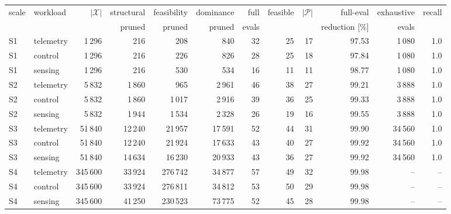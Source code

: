 \scriptsize
\setlength{\tabcolsep}{3.5pt}
\begin{tabular}{llrrrrrrrrrr}
\toprule
scale & workload & $|\mathcal{X}|$ & structural & feasibility & dominance & full & feasible & $|\mathcal{P}|$ & full-eval & exhaustive & recall \\
 & & & pruned & pruned & pruned & evals & & & reduction [\%] & evals & \\
\midrule
S1 & telemetry & 1\,296 & 216 & 208 & 840 & 32 & 25 & 17 & 97.53 & 1\,080 & 1.0 \\
S1 & control & 1\,296 & 216 & 226 & 826 & 28 & 25 & 18 & 97.84 & 1\,080 & 1.0 \\
S1 & sensing & 1\,296 & 216 & 530 & 534 & 16 & 11 & 11 & 98.77 & 1\,080 & 1.0 \\
S2 & telemetry & 5\,832 & 1\,860 & 965 & 2\,961 & 46 & 38 & 27 & 99.21 & 3\,888 & 1.0 \\
S2 & control & 5\,832 & 1\,860 & 1\,017 & 2\,916 & 39 & 36 & 25 & 99.33 & 3\,888 & 1.0 \\
S2 & sensing & 5\,832 & 1\,944 & 1\,534 & 2\,328 & 26 & 19 & 16 & 99.55 & 3\,888 & 1.0 \\
S3 & telemetry & 51\,840 & 12\,240 & 21\,957 & 17\,591 & 52 & 44 & 31 & 99.90 & 34\,560 & 1.0 \\
S3 & control & 51\,840 & 12\,240 & 21\,924 & 17\,633 & 43 & 40 & 27 & 99.92 & 34\,560 & 1.0 \\
S3 & sensing & 51\,840 & 14\,634 & 16\,230 & 20\,933 & 43 & 36 & 27 & 99.92 & 34\,560 & 1.0 \\
S4 & telemetry & 345\,600 & 33\,924 & 276\,742 & 34\,877 & 57 & 49 & 32 & 99.98 & -- & -- \\
S4 & control & 345\,600 & 33\,924 & 276\,811 & 34\,812 & 53 & 50 & 29 & 99.98 & -- & -- \\
S4 & sensing & 345\,600 & 41\,250 & 230\,523 & 73\,775 & 52 & 45 & 28 & 99.98 & -- & -- \\
\bottomrule
\end{tabular}
